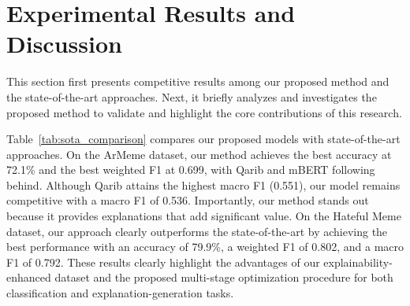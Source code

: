 

\section{Experimental Results and Discussion}
\label{label:results}


This section first presents competitive results among our proposed method and the state-of-the-art approaches. Next, it briefly analyzes and investigates the proposed method to validate and highlight the core contributions of this research.

Table~\ref{tab:sota_comparison} compares our proposed models with state-of-the-art approaches. On the ArMeme dataset, our method achieves the best accuracy at 72.1\% and the best weighted F1 at 0.699, with Qarib and mBERT following behind. Although Qarib attains the highest macro F1 (0.551), our model remains competitive with a macro F1 of 0.536. Importantly, our method stands out because it provides explanations that add significant value. On the Hateful Meme dataset, our approach clearly outperforms the state-of-the-art by achieving the best performance with an accuracy of 79.9\%, a weighted F1 of 0.802, and a macro F1 of 0.792. These results clearly highlight the advantages of our explainability-enhanced dataset and the proposed multi-stage optimization procedure for both classification and explanation-generation tasks.



\begin{table}[t]
\centering
\setlength{\tabcolsep}{3pt} 
\vspace{-0.2cm}
\caption{Comparison with SOTA and our results. ResNet50~\cite{he2016deep} is an image only model. MS: Multi-stage.}
\label{tab:sota_comparison}
\vspace{-0.3cm}
\end{table}


